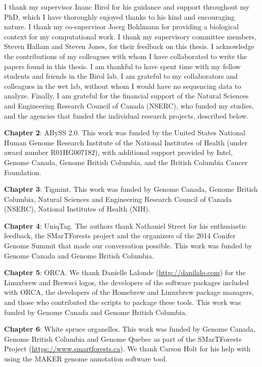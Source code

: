 \documentclass[
  12pt,
  oneside,
  openany]{book}
\begin{document}
I thank my supervisor Inanc Birol for his guidance and support throughout my PhD, which I have thoroughly enjoyed thanks to his kind and encouraging nature. I thank my co-supervisor Joerg Bohlmann for providing a biological context for my computational work. I thank my supervisory committee members, Steven Hallam and Steven Jones, for their feedback on this thesis. I acknowledge the contributions of my colleagues with whom I have collaborated to write the papers found in this thesis. I am thankful to have spent time with my fellow students and friends in the Birol lab. I am grateful to my collaborators and colleagues in the wet lab, without whom I would have no sequencing data to analyze. Finally, I am grateful for the financial support of the Natural Sciences and Engineering Research Council of Canada (NSERC), who funded my studies, and the agencies that funded the individual research projects, described below.

\textbf{Chapter 2}: ABySS 2.0. This work was funded by the United States National Human Genome Research Institute of the National Institutes of Health (under award number R01HG007182), with additional support provided by Intel, Genome Canada, Genome British Columbia, and the British Columbia Cancer Foundation.

\textbf{Chapter 3}: Tigmint. This work was funded by Genome Canada, Genome British Columbia, Natural Sciences and Engineering Research Council of Canada (NSERC), National Institutes of Health (NIH).

\textbf{Chapter 4}: UniqTag. The authors thank Nathaniel Street for his enthusiastic feedback, the SMarTForests project and the organizers of the 2014 Conifer Genome Summit that made our conversation possible. This work was funded by Genome Canada and Genome British Columbia.

\textbf{Chapter 5}: ORCA. We thank Danielle Lalonde (\url{http://danilalo.com}) for the Linuxbrew and Brewsci logos, the developers of the software packages included with ORCA, the developers of the Homebrew and Linuxbrew package managers, and those who contributed the scripts to package these tools. This work was funded by Genome Canada and Genome British Columbia.

\textbf{Chapter 6}: White spruce organelles. This work was funded by Genome Canada, Genome British Columbia and Genome Quebec as part of the SMarTForests Project (\url{https://www.smartforests.ca}). We thank Carson Holt for his help with using the MAKER genome annotation software tool.
\end{document}
